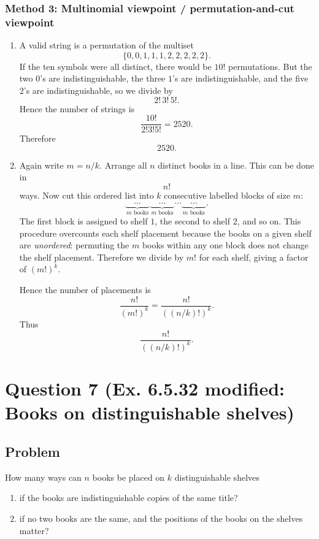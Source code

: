 \documentclass[12pt]{article}
\begin{document}
\subsubsection{Method 3: Multinomial viewpoint / permutation-and-cut viewpoint}
\begin{enumerate}[label=(\alph*)]
\item A valid string is a permutation of the multiset
\[
\{0,0,1,1,1,2,2,2,2,2\}.
\]
If the ten symbols were all distinct, there would be $10!$ permutations. But the two $0$'s are indistinguishable, the three $1$'s are indistinguishable, and the five $2$'s are indistinguishable, so we divide by
\[
2!\,3!\,5!.
\]
Hence the number of strings is
\[
\frac{10!}{2!3!5!}=2520.
\]
Therefore
\[
\boxed{2520}.
\]

\item Again write $m=n/k$. Arrange all $n$ distinct books in a line. This can be done in
\[
n!
\]
ways. Now cut this ordered list into $k$ consecutive labelled blocks of size $m$:
\[
\underbrace{\boxed{\phantom{aa}}\cdots\boxed{\phantom{aa}}}_{m\text{ books}}
\underbrace{\boxed{\phantom{aa}}\cdots\boxed{\phantom{aa}}}_{m\text{ books}}
\cdots
\underbrace{\boxed{\phantom{aa}}\cdots\boxed{\phantom{aa}}}_{m\text{ books}}.
\]
The first block is assigned to shelf $1$, the second to shelf $2$, and so on. This procedure overcounts each shelf placement because the books on a given shelf are \emph{unordered}: permuting the $m$ books within any one block does not change the shelf placement. Therefore we divide by $m!$ for each shelf, giving a factor of $(m!)^k$.

Hence the number of placements is
\[
\frac{n!}{(m!)^k}=\frac{n!}{\left((n/k)!\right)^k}.
\]
Thus
\[
\boxed{\frac{n!}{\left((n/k)!\right)^k}}.
\]
\end{enumerate}

\newpage

\section{Question 7 (Ex. 6.5.32 modified: Books on distinguishable shelves)}
\subsection{Problem}
How many ways can $n$ books be placed on $k$ distinguishable shelves
\begin{enumerate}[label=(\alph*)]
\item if the books are indistinguishable copies of the same title?
\item if no two books are the same, and the positions of the books on the shelves matter?
\end{enumerate}
\end{document}
